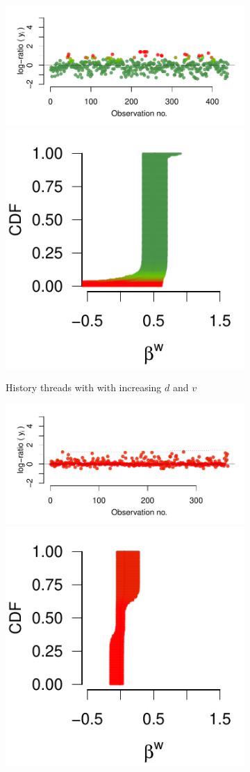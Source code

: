 \documentclass[9pt,a4paper,twocolumn,lineno]{article}
\begin{document}
\begin{figure}
\begin{subfigure}{.49\linewidth}
		{\includegraphics[width=.65\linewidth]{threads/thread_history_1097_9}			\includegraphics[width=.33\linewidth]{betas/beta_history_1097_9}}
		
		
		\vspace{10px}
		\hspace{10px}
		History threads with with increasing $d$ and $v$
		
		\label{fig:supp hist}
	\end{subfigure}
	\begin{subfigure}{.49\linewidth}
		{\includegraphics[width=.65\linewidth]{threads/thread_max_55_1}	\includegraphics[width=.33\linewidth]{betas/beta_max_55_1}	}


\end{subfigure}
\end{figure}
\end{document}
